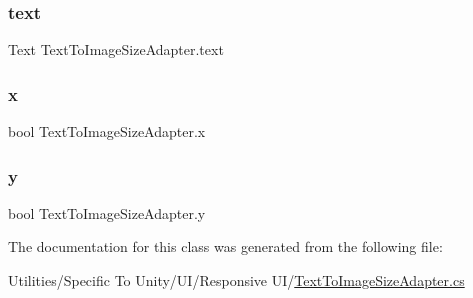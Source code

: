 \subsubsection{\texorpdfstring{text}{text}}
{\footnotesize\ttfamily Text Text\+To\+Image\+Size\+Adapter.\+text}

\mbox{\label{class_text_to_image_size_adapter_a587a45f5568eb0d384724fb8649403f7}} 
\subsubsection{\texorpdfstring{x}{x}}
{\footnotesize\ttfamily bool Text\+To\+Image\+Size\+Adapter.\+x}

\mbox{\label{class_text_to_image_size_adapter_a5faa4a6091e8c3fc622623c0b8f2fa56}} 
\subsubsection{\texorpdfstring{y}{y}}
{\footnotesize\ttfamily bool Text\+To\+Image\+Size\+Adapter.\+y}



The documentation for this class was generated from the following file\+:\begin{DoxyCompactItemize}
\item 
Utilities/\+Specific To Unity/\+U\+I/\+Responsive U\+I/\hyperlink{_text_to_image_size_adapter_8cs}{Text\+To\+Image\+Size\+Adapter.\+cs}\end{DoxyCompactItemize}
